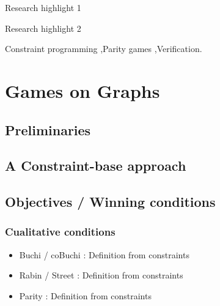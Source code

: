 \documentclass[preprint,12pt,authoryear]{elsarticle}
\begin{document}
\begin{frontmatter}
\begin{abstract}
Because new constraints can be seamlessly integrated, our method provides a highly flexible framework for refining existing problem formulations to search for preferred solutions. This extensibility allows the framework to solve multi-conditioned games, such as those combining parity conditions with cost or resource-bounded requirements. Finally, we present the theoretical foundations of our approach, a comprehensive experimental evaluation, and an analysis of different algorithmic variants.
\end{abstract}

\begin{graphicalabstract}
\end{graphicalabstract}

\begin{highlights}
\item Research highlight 1
\item Research highlight 2
\end{highlights}

\begin{keyword}
Constraint programming  \sep Parity games \sep Verification.
\end{keyword}

\end{frontmatter}


\newpage
\section{Games on Graphs}
\subsection{Preliminaries}
\subsection{A Constraint-base approach}
\subsection{Objectives / Winning conditions}
\subsubsection{Cualitative conditions}
\begin{itemize}
  \item Buchi / coBuchi : Definition from constraints
  \item Rabin / Street : Definition from constraints
  \item Parity : Definition from constraints
\end{itemize}
\end{document}

